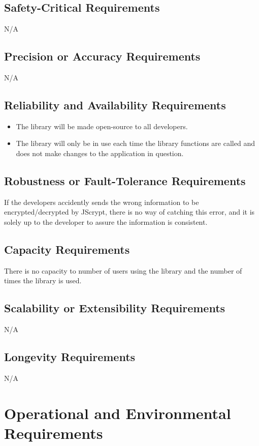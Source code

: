 \documentclass[12pt]{article}
\begin{document}
\subsection {Safety-Critical Requirements}
N/A

\subsection {Precision or Accuracy Requirements}
N/A

\subsection {Reliability and Availability Requirements}
\begin{itemize}
	\item The library will be made open-source to all developers.
	\item The library will only be in use each time the library functions are called and does not make changes to the application in question.
\end{itemize}

\subsection {Robustness or Fault-Tolerance Requirements}
If the developers accidently sends the wrong information to be encrypted/decrypted by JScrypt, there is no way of catching this error, and it is solely up to the developer to assure the information is consistent.

\subsection {Capacity Requirements}
There is no capacity to number of users using the library and the number of times the library is used.


\subsection {Scalability or Extensibility Requirements}
N/A

\subsection {Longevity Requirements}
N/A

\section {Operational and Environmental Requirements}
\end{document}

